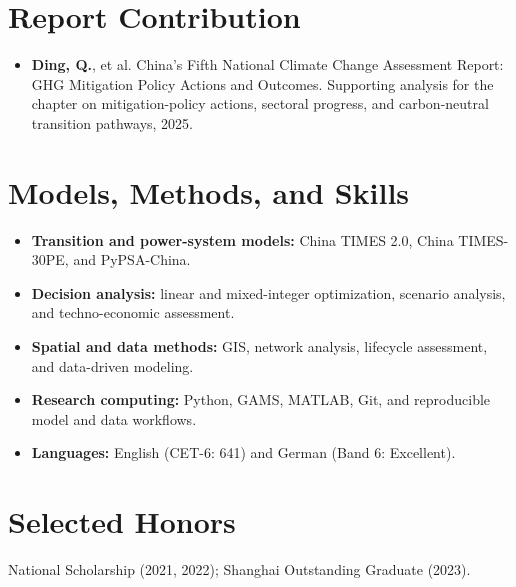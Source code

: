\documentclass[10pt,a4paper]{article}
\begin{document}
\section{Report Contribution}
\begin{itemize}
  \item \textbf{Ding, Q.}, et al. China's Fifth National Climate Change Assessment Report: GHG Mitigation Policy Actions and Outcomes. Supporting analysis for the chapter on mitigation-policy actions, sectoral progress, and carbon-neutral transition pathways, 2025.
\end{itemize}

\section{Models, Methods, and Skills}
\begin{itemize}
  \item \textbf{Transition and power-system models:} China TIMES 2.0, China TIMES-30PE, and PyPSA-China.
  \item \textbf{Decision analysis:} linear and mixed-integer optimization, scenario analysis, and techno-economic assessment.
  \item \textbf{Spatial and data methods:} GIS, network analysis, lifecycle assessment, and data-driven modeling.
  \item \textbf{Research computing:} Python, GAMS, MATLAB, Git, and reproducible model and data workflows.
  \item \textbf{Languages:} English (CET-6: 641) and German (Band 6: Excellent).
\end{itemize}

\section{Selected Honors}
National Scholarship (2021, 2022); Shanghai Outstanding Graduate (2023).
\end{document}
